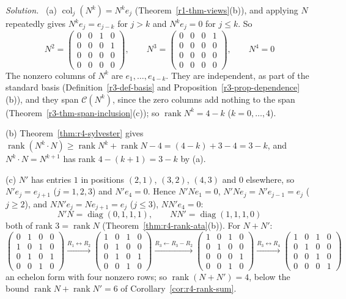 \documentclass[12pt]{article}
\DeclareMathOperator{\col}{col}
\DeclareMathOperator{\diag}{diag}
\DeclareMathOperator{\rank}{rank}
\theoremstyle{definition}
\newenvironment{solution}{\par\noindent\textit{Solution.}\ }{\par\smallskip}
\begin{document}
\begin{solution}
(a) \(\col_j(N^k)=N^ke_j\) (Theorem~\ref{r1-thm-views}(b)), and applying \(N\) repeatedly gives
\(N^ke_j=e_{j-k}\) for \(j>k\) and \(N^ke_j=0\) for \(j\leqslant k\). So
\[
N^2=\begin{pmatrix}0&0&1&0\\0&0&0&1\\0&0&0&0\\0&0&0&0\end{pmatrix},\qquad
N^3=\begin{pmatrix}0&0&0&1\\0&0&0&0\\0&0&0&0\\0&0&0&0\end{pmatrix},\qquad N^4=0
\]
The nonzero columns of \(N^k\) are \(e_1,\dots,e_{4-k}\). They are independent, as part of the standard basis
(Definition~\ref{r3-def-basis} and Proposition~\ref{r3-prop-dependence}(b)), and they span \(\mathcal C(N^k)\), since
the zero columns add nothing to the span (Theorem~\ref{r3-thm-span-inclusion}(c)); so \(\rank N^k=4-k\)
(\(k=0,\dots,4\)).

(b) Theorem~\ref{thm:r4-sylvester} gives
\(\rank(N^k\cdot N)\geqslant\rank N^k+\rank N-4=(4-k)+3-4=3-k\), and \(N^k\cdot N=N^{k+1}\) has rank
\(4-(k+1)=3-k\) by (a).

(c) \(N'\) has entries \(1\) in positions \((2,1)\), \((3,2)\), \((4,3)\) and \(0\) elsewhere, so \(N'e_j=e_{j+1}\)
(\(j=1,2,3\)) and \(N'e_4=0\). Hence \(N'Ne_1=0\), \(N'Ne_j=N'e_{j-1}=e_j\) (\(j\geqslant2\)), and
\(NN'e_j=Ne_{j+1}=e_j\) (\(j\leqslant3\)), \(NN'e_4=0\):
\[
N'N=\diag(0,1,1,1),\qquad NN'=\diag(1,1,1,0)
\]
both of rank \(3=\rank N\) (Theorem~\ref{thm:r4-rank-ata}(b)). For \(N+N'\):
\[
\begin{pmatrix}0&1&0&0\\1&0&1&0\\0&1&0&1\\0&0&1&0\end{pmatrix}
\xrightarrow{R_1\leftrightarrow R_2}
\begin{pmatrix}1&0&1&0\\0&1&0&0\\0&1&0&1\\0&0&1&0\end{pmatrix}
\xrightarrow{R_3\leftarrow R_3-R_2}
\begin{pmatrix}1&0&1&0\\0&1&0&0\\0&0&0&1\\0&0&1&0\end{pmatrix}
\xrightarrow{R_3\leftrightarrow R_4}
\begin{pmatrix}1&0&1&0\\0&1&0&0\\0&0&1&0\\0&0&0&1\end{pmatrix}
\]
an echelon form with four nonzero rows; so \(\rank(N+N')=4\), below the bound
\(\rank N+\rank N'=6\) of Corollary~\ref{cor:r4-rank-sum}.
\end{solution}
\end{document}
